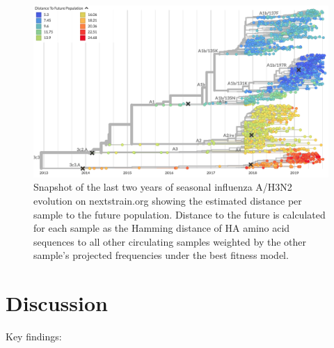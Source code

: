 \begin{figure}[ht]
  \begin{center}
  \includegraphics[width=\textwidth]{figures/nextstrain-weighted-distance-to-future-per-strain.png}
  \caption{
    Snapshot of the last two years of seasonal influenza A/H3N2 evolution on nextstrain.org showing the estimated distance per sample to the future population.
    Distance to the future is calculated for each sample as the Hamming distance of HA amino acid sequences to all other circulating samples weighted by the other sample's projected frequencies under the best fitness model.
  }
  \label{fig:nextstrain_distance_to_future}
  \end{center}
\end{figure}

\section*{Discussion}

Key findings:

